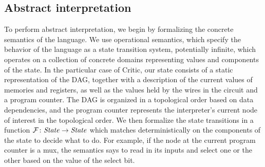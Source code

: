 \documentclass[10pt,conference]{IEEEtran}
\begin{document}

\subsection{Abstract interpretation}
To perform abstract interpretation, we begin by formalizing the concrete
semantics of the language. We use operational semantics, which specify
the behavior of the language as a state transition system, potentially infinite,
which operates on a collection of concrete domains representing values and components
of the state. In the particular case of Critic, our state consists of a static representation
of the DAG, together with a description of the current values of memories and registers, as well
as the values held by the wires in the circuit and a program counter. The DAG is organized
in a topological order based on data dependencies, and the program counter represents the interpreter's
current node of interest in the topological order. We then formalize the state transitions in a function
$\mathcal F\colon\mathit{State}\to\mathit{State}$ which matches deterministically on the components of the state to decide
what to do. For example, if the node at the current program counter is a mux, the semantics says to read
in its inputs and select one or the other based on the value of the select bit.
\end{document}
